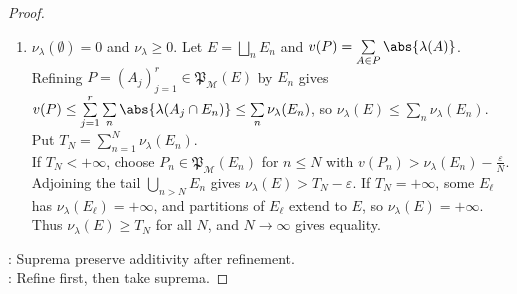 \begin{proposition}
\begin{proof}
\begin{enumerate}[label=(\roman*)]
\item $\nu_\lambda(\emptyset)=0$ and $\nu_\lambda\geq0$. Let $E=\bigsqcup\limits_nE_n$ and $v(P)=\sum\limits_{A\in P}\abs{\lambda(A)}$. Refining $P=(A_j)_{j=1}^{r}\in\mathfrak{P}_{\mathcal{M}}(E)$ by $E_n$ gives $v(P)\leq\sum\limits_{j=1}^{r}\sum\limits_n\abs{\lambda(A_j\cap E_n)}\leq\sum\limits_n\nu_\lambda(E_n)$, so $\nu_\lambda(E)\leq\sum\limits_n\nu_\lambda(E_n)$. Put $T_N=\sum\limits_{n=1}^{N}\nu_\lambda(E_n)$.\\
If $T_N<+\infty$, choose $P_n\in\mathfrak{P}_{\mathcal{M}}(E_n)$ for $n\leq N$ with $v(P_n)>\nu_\lambda(E_n)-\frac{\varepsilon}{N}$.\\
Adjoining the tail $\bigcup\limits_{n>N}E_n$ gives $\nu_\lambda(E)>T_N-\varepsilon$. If $T_N=+\infty$, some $E_\ell$ has $\nu_\lambda(E_\ell)=+\infty$, and partitions of $E_\ell$ extend to $E$, so $\nu_\lambda(E)=+\infty$. Thus $\nu_\lambda(E)\geq T_N$ for all $N$, and $N\to\infty$ gives equality.
\end{enumerate}
: Suprema preserve additivity after refinement.\\
: Refine first, then take suprema.
\end{proof}
\end{proposition}
